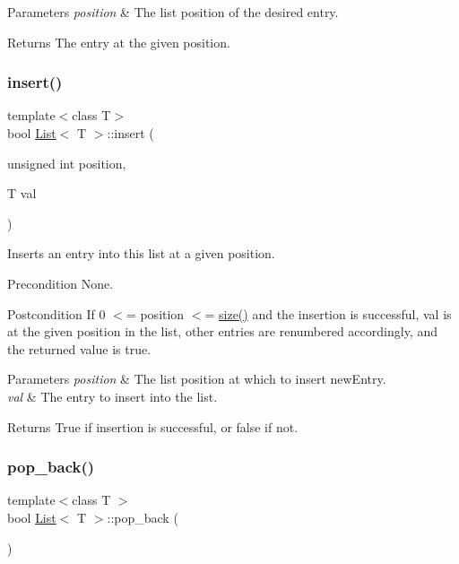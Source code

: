 \begin{DoxyParams}{Parameters}
{\em position} & The list position of the desired entry. \\
\hline
\end{DoxyParams}
\begin{DoxyReturn}{Returns}
The entry at the given position. 
\end{DoxyReturn}
\mbox{\label{class_list_a9c20ddd34151f1fdf67549f3c94364da}} 
\subsubsection{\texorpdfstring{insert()}{insert()}}
{\footnotesize\ttfamily template$<$class T$>$ \\
bool \hyperlink{class_list}{List}$<$ T $>$\+::insert (\begin{DoxyParamCaption}\item[{unsigned int}]{position,  }\item[{T}]{val }\end{DoxyParamCaption})}

Inserts an entry into this list at a given position. \begin{DoxyPrecond}{Precondition}
None. 
\end{DoxyPrecond}
\begin{DoxyPostcond}{Postcondition}
If 0 $<$= position $<$= \hyperlink{class_list_aec8852ab225094e14ad424e8d71a4dac}{size()} and the insertion is successful, val is at the given position in the list, other entries are renumbered accordingly, and the returned value is true. 
\end{DoxyPostcond}

\begin{DoxyParams}{Parameters}
{\em position} & The list position at which to insert new\+Entry. \\
\hline
{\em val} & The entry to insert into the list. \\
\hline
\end{DoxyParams}
\begin{DoxyReturn}{Returns}
True if insertion is successful, or false if not. 
\end{DoxyReturn}
\mbox{\label{class_list_aa6ff98e23b4ceea509e3a29fa5ceecd7}} 
\subsubsection{\texorpdfstring{pop\+\_\+back()}{pop\_back()}}
{\footnotesize\ttfamily template$<$class T $>$ \\
bool \hyperlink{class_list}{List}$<$ T $>$\+::pop\+\_\+back (\begin{DoxyParamCaption}{ }\end{DoxyParamCaption})}

